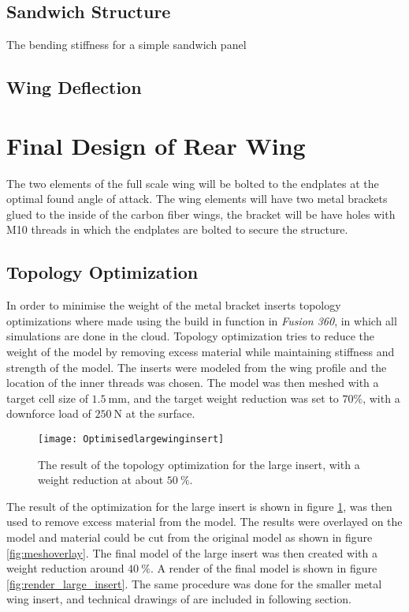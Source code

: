   \subsection{Sandwich Structure}

    The bending stiffness for a simple sandwich panel

  \subsection{Wing Deflection}

\section{Final Design of Rear Wing}

  The two elements of the full scale wing will be bolted to the endplates at the optimal found angle of attack. The wing elements will have two metal brackets glued to the inside of the carbon fiber wings, the bracket will be have holes with M10 threads in which the endplates are bolted to secure the structure.

  \subsection{Topology Optimization}

  In order to minimise the weight of the metal bracket inserts topology optimizations where made using the build in function in \emph{Fusion 360}, in which all simulations are done in the cloud. Topology optimization tries to reduce the weight of the model by removing excess material while maintaining stiffness and strength of the model.
  The inserts were modeled from the wing profile and the location of the inner threads was chosen. The model was then meshed with a target cell size of $\SI{1.5}{\milli\metre}$, and the target weight reduction was set to $70\%$, with a downforce load of $\SI{250}{\newton}$ at the surface.

  \begin{figure}
    \texttt{[image: Optimisedlargewinginsert]}
    \caption{The result of the topology optimization for the large insert, with a weight reduction at about $\SI{50}{\%}$.}
    \label{fig:topology_large_insert}
  \end{figure}

  The result of the optimization for the large insert is shown in figure \ref{fig:topology_large_insert}, was then used to remove excess material from the model. The results were overlayed on the model and material could be cut from the original model as shown in figure
  \ref{fig:meshoverlay}. The final model of the large insert was then created with a weight reduction around $\SI{40}{\%}$. A render of the final model is shown in
  figure \ref{fig:render_large_insert}. The same procedure was done for the smaller metal wing insert, and technical drawings of are included in following section.


